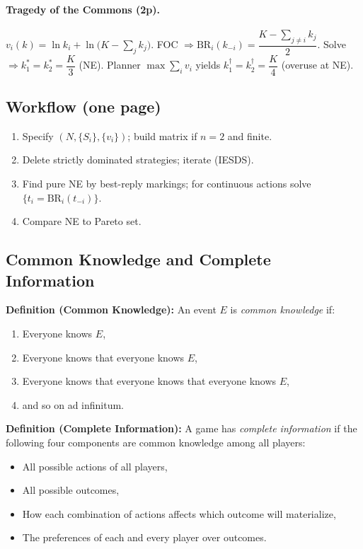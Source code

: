\documentclass[10pt]{article}
\newcommand{\Players}{N}
\newcommand{\vi}{v_i}
\newcommand{\BR}{\mathrm{BR}}
\begin{document}
\paragraph{Tragedy of the Commons (2p).} $v_i(k)=\ln k_i+\ln\!\big(K-\sum_j k_j\big)$.
FOC $\Rightarrow \BR_i(k_{-i})=\dfrac{K-\sum_{j\ne i}k_j}{2}$.
Solve $\Rightarrow k_1^*=k_2^*=\dfrac{K}{3}$ (NE). Planner $\max \sum_i v_i$ yields $k_1^\dagger=k_2^\dagger=\dfrac{K}{4}$ (overuse at NE).

\subsection*{Workflow (one page)}
\begin{enumerate}[leftmargin=*,itemsep=1pt,topsep=2pt]
  \item Specify $(\Players,\{S_i\},\{\vi\})$; build matrix if $n=2$ and finite.
  \item Delete strictly dominated strategies; iterate (IESDS).
  \item Find pure NE by best-reply markings; for continuous actions solve $\{t_i=\BR_i(t_{-i})\}$.
  \item Compare NE to Pareto set.
\end{enumerate}

  \subsection*{Common Knowledge and Complete Information}

  \textbf{Definition (Common Knowledge):} An event $E$ is \emph{common knowledge} if:
  \begin{enumerate}[label=\arabic*)]
    \item Everyone knows $E$,
    \item Everyone knows that everyone knows $E$,
    \item Everyone knows that everyone knows that everyone knows $E$,
    \item and so on ad infinitum.
  \end{enumerate}

  \textbf{Definition (Complete Information):} A game has \emph{complete information} if the following four components are common knowledge among all players:
  \begin{itemize}
    \item All possible actions of all players,
    \item All possible outcomes,
    \item How each combination of actions affects which outcome will materialize,
    \item The preferences of each and every player over outcomes.
  \end{itemize}
\end{document}
